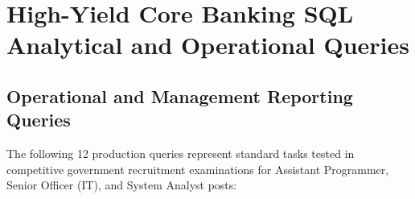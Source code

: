 \section{High-Yield Core Banking SQL Analytical and Operational Queries}
\label{sec:dbms_banking_queries}

\subsection{Operational and Management Reporting Queries}
The following 12 production queries represent standard tasks tested in competitive government recruitment examinations for Assistant Programmer, Senior Officer (IT), and System Analyst posts:

